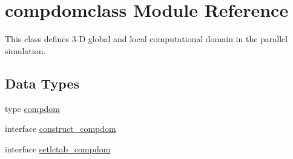 \hypertarget{namespacecompdomclass}{}\section{compdomclass Module Reference}
\label{namespacecompdomclass}


This class defines 3-\/D global and local computational domain in the parallel simulation.  


\subsection*{Data Types}
\begin{DoxyCompactItemize}
\item 
type \mbox{\hyperlink{namespacecompdomclass_structcompdomclass_1_1compdom}{compdom}}
\item 
interface \mbox{\hyperlink{interfacecompdomclass_1_1construct__compdom}{construct\+\_\+compdom}}
\item 
interface \mbox{\hyperlink{interfacecompdomclass_1_1setlctab__compdom}{setlctab\+\_\+compdom}}
\end{DoxyCompactItemize}
